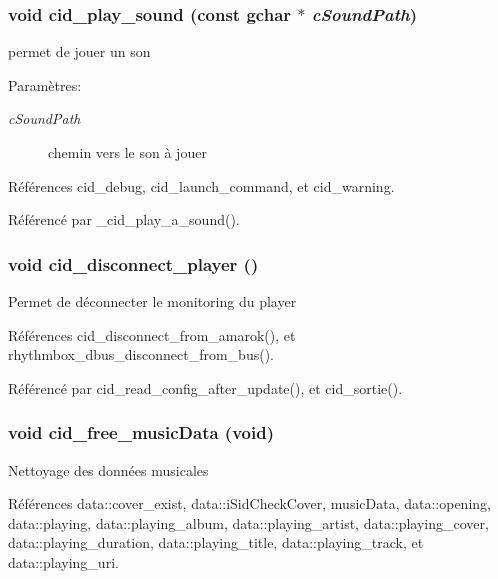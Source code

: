 \subsubsection{\setlength{\rightskip}{0pt plus 5cm}void cid\_\-play\_\-sound (const gchar $\ast$ {\em cSoundPath})}\label{cid-utilities_8h_38b7ceae01036942ac314cb69bccaa0d}


permet de jouer un son \begin{Desc}
\item[Paramètres:]
\begin{description}
\item[{\em cSoundPath}]chemin vers le son à jouer \end{description}
\end{Desc}


Références cid\_\-debug, cid\_\-launch\_\-command, et cid\_\-warning.

Référencé par \_\-cid\_\-play\_\-a\_\-sound().
\subsubsection{\setlength{\rightskip}{0pt plus 5cm}void cid\_\-disconnect\_\-player ()}\label{cid-utilities_8h_f341249c88a564232783326fbb667a23}


Permet de déconnecter le monitoring du player 

Références cid\_\-disconnect\_\-from\_\-amarok(), et rhythmbox\_\-dbus\_\-disconnect\_\-from\_\-bus().

Référencé par cid\_\-read\_\-config\_\-after\_\-update(), et cid\_\-sortie().
\subsubsection{\setlength{\rightskip}{0pt plus 5cm}void cid\_\-free\_\-musicData (void)}\label{cid-utilities_8h_1fb8206b73ce7aa1aba3d8f6bebc8b5b}


Nettoyage des données musicales 

Références data::cover\_\-exist, data::iSidCheckCover, musicData, data::opening, data::playing, data::playing\_\-album, data::playing\_\-artist, data::playing\_\-cover, data::playing\_\-duration, data::playing\_\-title, data::playing\_\-track, et data::playing\_\-uri.

